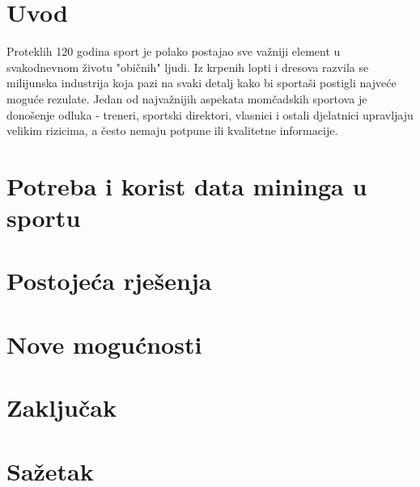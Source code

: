 \documentclass{ferseminar}
\begin{document}
\stvoripredstranice
\section{Uvod}

Proteklih 120 godina sport je polako postajao sve važniji element u svakodnevnom životu "običnih" ljudi. Iz krpenih lopti i dresova razvila se milijunska industrija koja pazi na svaki detalj kako bi sportaši postigli najveće moguće rezulate. Jedan od najvažnijih aspekata momčadskih sportova je donošenje odluka - treneri, sportski direktori, vlasnici i ostali djelatnici upravljaju velikim rizicima, a često nemaju potpune ili kvalitetne informacije.

\section{Potreba i korist data mininga u sportu}
\section{Postojeća rješenja}
\section{Nove mogućnosti}
\section{Zaključak}
\section{Sažetak}
\end{document}
